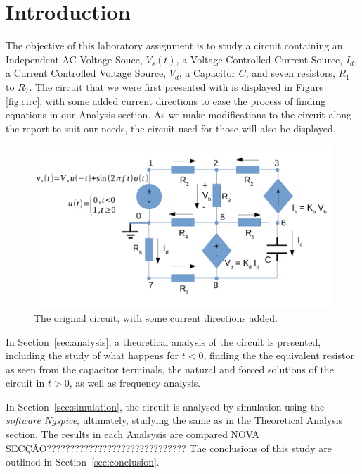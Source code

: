 \section{Introduction}
\label{sec:introduction}

The objective of this laboratory assignment is to study a circuit containing an Independent AC Voltage Souce, $V_s(t)$, a Voltage Controlled Current Source, $I_d$, a Current Controlled Voltage Source, $V_d$, a Capacitor $C$, and seven resistors, $R_1$ to $R_7$. The circuit that we were first presented with is displayed in Figure \ref{fig:circ}, with some added current directions to ease the process of finding equations in our Analysis section. As we make modifications to the circuit along the report to suit our needs, the circuit used for those will also be displayed.

\begin{figure}[h] \centering
\includegraphics[width=0.4\linewidth]{t2-original.pdf}
\caption{The original circuit, with some current directions added.}
\label{fig1}
\end{figure}

In Section~\ref{sec:analysis}, a theoretical analysis of the circuit is
presented, including the study of what happens for $t<0$, finding the the equivalent resistor as seen from the capacitor
terminals, the natural and forced solutions of the circuit in $t>0$, as well as frequency analysis.

In Section~\ref{sec:simulation}, the circuit is analysed by
simulation using the \textit{software Ngspice}, ultimately, studying the same as in the Theoretical Analysis section.
The results in each Analsysis are compared NOVA SECÇÃO??????????????????????????????
The conclusions of this study are outlined in
Section~\ref{sec:conclusion}.
